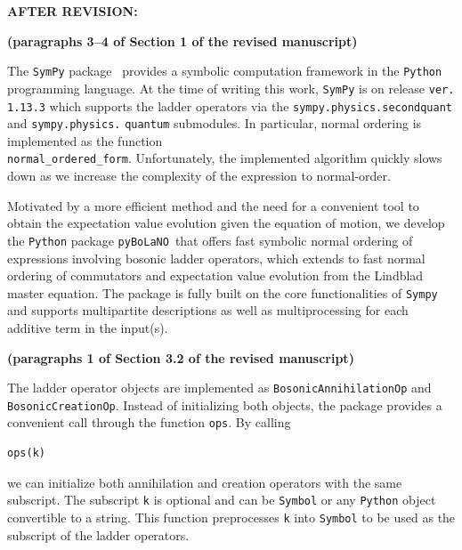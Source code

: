 \documentclass[12pt, a4paper]{article}
\newcommand{\inlinecode}[1]{\texttt{#1}}
\newcommand{\pybolano}{\texttt{pyBoLaNO}~}
\newenvironment{revision}{%
\color{red}
}
{}
\newenvironment{revpost}{%
\textbf{{AFTER REVISION:}}
\par
}
{}
\begin{document}
\begin{revpost}

\textbf{(paragraphs 3--4 of Section 1 of the revised manuscript)}

The \texttt{SymPy} package~\cite{meurer_sympy_2017} provides a symbolic computation framework in the \texttt{Python} programming language. \begin{revision}At the time of writing this work, \texttt{SymPy} is on release \inlinecode{ver. 1.13.3} which supports the ladder operators via the \inlinecode{sympy.physics.secondquant} and \inlinecode{sympy.physics.} \inlinecode{quantum} submodules. In particular, normal ordering is implemented as the function \\ \inlinecode{normal_ordered_form}. Unfortunately, the implemented algorithm quickly slows down as we increase the complexity of the expression to normal-order.\end{revision}

\begin{revision}Motivated by a more efficient method and the need for a convenient tool to obtain the expectation value evolution given the equation of motion, we develop the \texttt{Python} package \pybolano that offers fast symbolic normal ordering of expressions involving bosonic ladder operators, which extends to fast normal ordering of commutators and expectation value evolution from the Lindblad master equation. The package is fully built on the core functionalities of \texttt{Sympy} and supports multipartite descriptions as well as multiprocessing for each additive term in the input(s).\end{revision}

\textbf{(paragraphs 1 of Section 3.2 of the revised manuscript)}

\begin{revision}The ladder operator objects are implemented as \inlinecode{BosonicAnnihilationOp} and \inlinecode{BosonicCreationOp}. Instead of initializing both objects, the package provides a convenient call through the function \inlinecode{ops}. By calling\end{revision}
\begin{verbatim}
ops(k)
\end{verbatim}
we can initialize both annihilation and creation operators with the same subscript. The subscript \inlinecode{k} is optional and can be \inlinecode{Symbol} or any \texttt{Python} object convertible to a string. This function preprocesses \inlinecode{k} into \inlinecode{Symbol} to be used as the subscript of the ladder operators. 
\end{revpost}
\end{document}
